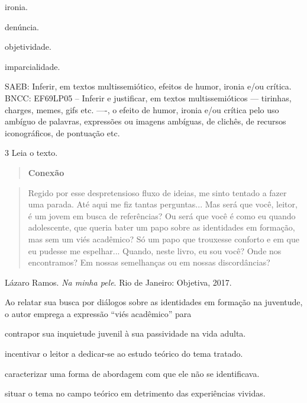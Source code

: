 \begin{escolha}
\item ironia.

\item denúncia.

\item objetividade.

\item imparcialidade.
\end{escolha}

SAEB: Inferir, em textos multissemiótico, efeitos de humor, ironia e/ou
crítica. BNCC: EF69LP05 -- Inferir e justificar, em textos
multissemióticos --- tirinhas, charges, memes, gifs etc. ----, o efeito
de humor, ironia e/ou crítica pelo uso ambíguo de palavras, expressões
ou imagens ambíguas, de clichês, de recursos iconográficos, de pontuação
etc.

\num{3} Leia o texto.

\begin{quote}
\textbf{Conexão}
\end{quote}

\begin{quote}
Regido por esse despretensioso fluxo de ideias, me sinto tentado a fazer
uma parada. Até aqui me fiz tantas perguntas... Mas será que você,
leitor, é um jovem em busca de referências? Ou será que você é como eu
quando adolescente, que queria bater um papo sobre as identidades em
formação, mas sem um viés acadêmico? Só um papo que trouxesse conforto e
em que eu pudesse me espelhar... Quando, neste livro, eu sou você? Onde
nos encontramos? Em nossas semelhanças ou em nossas discordâncias?
\end{quote}

Lázaro Ramos. \emph{Na minha pele}. Rio de Janeiro: Objetiva, 2017.

Ao relatar sua busca por diálogos sobre as identidades em formação na
juventude, o autor emprega a expressão ``viés acadêmico'' para

\begin{escolha}
\item contrapor sua inquietude juvenil à sua passividade na vida adulta.

\item incentivar o leitor a dedicar-se ao estudo teórico do tema tratado.

\item caracterizar uma forma de abordagem com que ele não se identificava.

\item situar o tema no campo teórico em detrimento das experiências
vividas.
\end{escolha}

